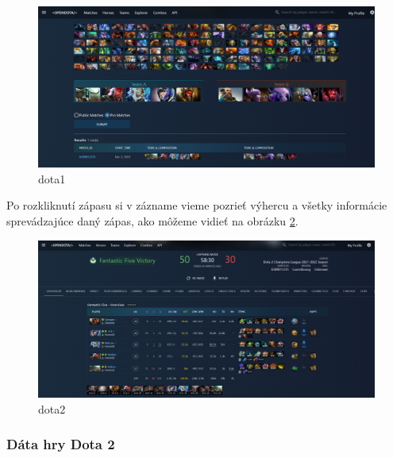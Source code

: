  \begin{figure}[h!]
	\includegraphics[width=.9\textwidth]{figures/dota1}
	\centering
	\caption{ dota1 \label{dota1}}
	
\end{figure}

Po rozkliknutí zápasu si v zázname vieme pozrieť výhercu a všetky informácie sprevádzajúce daný zápas, ako môžeme vidieť na obrázku \ref{dota2}.

 \begin{figure}[h!]
	
	\includegraphics[width=.9\textwidth]{figures/dota2}
	\centering
	\caption{ dota2 \label{dota2}}
	
\end{figure}

\subsubsection{Dáta hry Dota 2}

